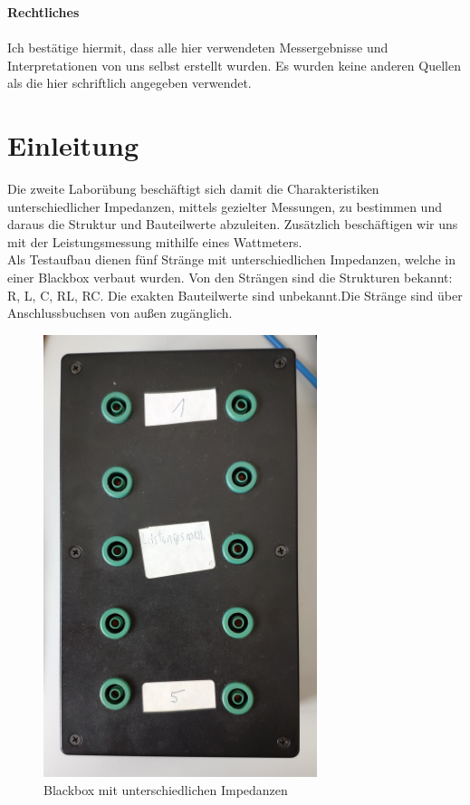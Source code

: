 \documentclass[a4paper,12pt]{article}
\begin{document}
	
	
	\noindent
	\textbf{\Large Rechtliches} \\ \\
	Ich bestätige hiermit, dass alle hier verwendeten Messergebnisse und Interpretationen von uns selbst erstellt wurden. Es wurden keine anderen Quellen als die hier schriftlich angegeben verwendet.
	\setcounter{page}{2}
	
	\newpage
	\tableofcontents
	
	\newpage
	\section{Einleitung}
	Die zweite Laborübung beschäftigt sich damit die Charakteristiken unterschiedlicher Impedanzen, mittels gezielter Messungen, zu bestimmen und daraus die Struktur und Bauteilwerte abzuleiten. Zusätzlich beschäftigen wir uns mit der Leistungsmessung mithilfe eines Wattmeters. \\ \newline
	Als Testaufbau dienen fünf Stränge mit unterschiedlichen Impedanzen, welche in einer Blackbox verbaut wurden. Von den Strängen sind die Strukturen bekannt: R, L, C, RL, RC. Die exakten Bauteilwerte sind unbekannt.Die Stränge sind über Anschlussbuchsen von außen zugänglich. \\ \newline
	\begin{figure}[h]
		\centering
		\includegraphics[width=8cm]{assets/blackbox}
		\caption{Blackbox mit unterschiedlichen Impedanzen}
	\end{figure}
\end{document}
